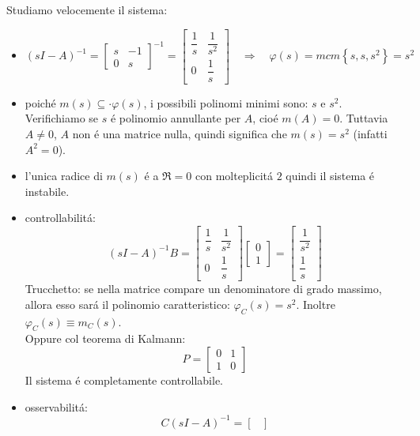 \documentclass[../main.tex]{subfiles}
\begin{document}
\begin{Exercise}[title={Retroazione algebrica sull'uscita}, difficulty=1]
			Studiamo velocemente il sistema:
			\begin{itemize}
				\item 
					\[
						(sI-A)^{-1} =
						\begin{bmatrix}
							s & -1\\
							0 & s
						\end{bmatrix}^{-1} =
						\begin{bmatrix}
							\dfrac{1}{s} & \dfrac{1}{s^2}\\[.5cm]
							0 & \dfrac{1}{s}
						\end{bmatrix}
						\quad\Rightarrow\quad
						\varphi(s) = mcm\left\lbrace s, s, s^2 \right\rbrace = s^2
					\]
				\item 
					poich\'e $ m(s) \subseteq\cdot \varphi(s) $, i possibili polinomi minimi sono: $ s $ e $ s^2 $. Verifichiamo se $ s $ \'e polinomio annullante per $ A $, cio\'e $ m(A) = 0 $. Tuttavia $ A \neq 0 $, $ A $ non \'e una matrice nulla, quindi significa che $ m(s) = s^2 $ (infatti $ A^2 = 0 $).
				\item 
					l'unica radice di $ m(s) $ \'e a $ \Re = 0 $ con molteplicit\'a $ 2 $ quindi il sistema \'e instabile.
				\item 
					controllabilit\'a:
					\[
						(sI-A)^{-1}B=
						\begin{bmatrix}
							\dfrac{1}{s} & \dfrac{1}{s^2}\\[.5cm]
							0 & \dfrac{1}{s}
						\end{bmatrix}
						\begin{bmatrix}
							0\\
							1
						\end{bmatrix} =
						\begin{bmatrix}
							\dfrac{1}{s^2}\\[.5cm]
							\dfrac{1}{s}
						\end{bmatrix}
					\]
					Trucchetto: se nella matrice compare un denominatore di grado massimo, allora esso sar\'a il polinomio caratteristico: $ \varphi_C(s) = s^2 $. Inoltre $ \varphi_C(s) \equiv m_C(s) $.\\
					Oppure col teorema di Kalmann:
					\[
						P =
						\begin{bmatrix}
							0 & 1\\
							1 & 0
						\end{bmatrix}
					\]
					Il sistema \'e completamente controllabile.
				\item 
					osservabilit\'a:
					\[
						C(sI-A)^{-1} = 
						\begin{bmatrix}

\end{bmatrix}\]
\end{itemize}
\end{Exercise}
\end{document}

